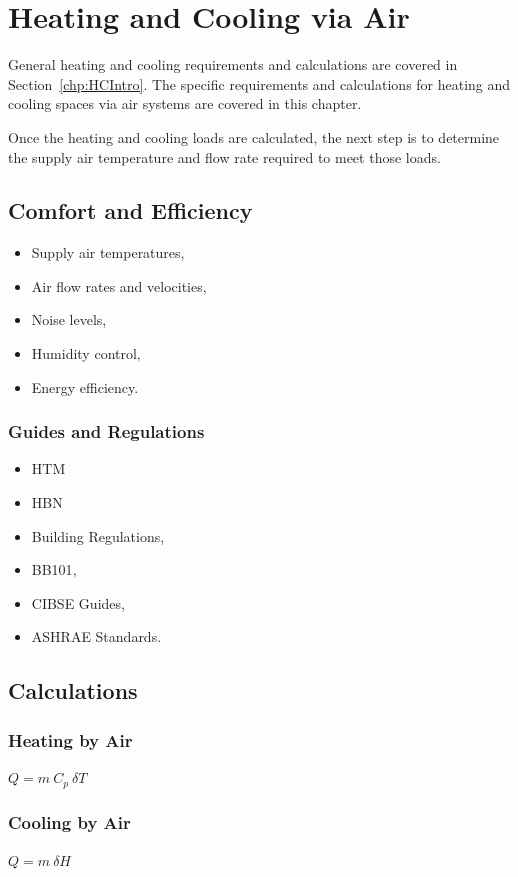 \chapter{Heating and Cooling via Air}
\label{chp:h&c}

General heating and cooling requirements and calculations are covered in Section~\ref{chp:HCIntro}. The specific requirements and calculations for heating and cooling spaces via air systems are covered in this chapter.

Once the heating and cooling loads are calculated, the next step is to determine the supply air temperature and flow rate required to meet those loads. 

\section{Comfort and Efficiency}

\begin{itemize}
    \item Supply air temperatures,
    \item Air flow rates and velocities,
    \item Noise levels,
    \item Humidity control,
    \item Energy efficiency.
\end{itemize}

\subsection{Guides and Regulations}

\begin{itemize}
    \item \gls{HTM}
    \item \gls{HBN}
    \item Building Regulations,
    \item \gls{BB101},
    \item \gls{CIBSE} Guides,
    \item \gls{ASHRAE} Standards.
\end{itemize}

\section{Calculations}

\subsection{Heating by Air}

$Q = m~C_p~\delta T$

\subsection{Cooling by Air}

$Q = m~\delta H$
